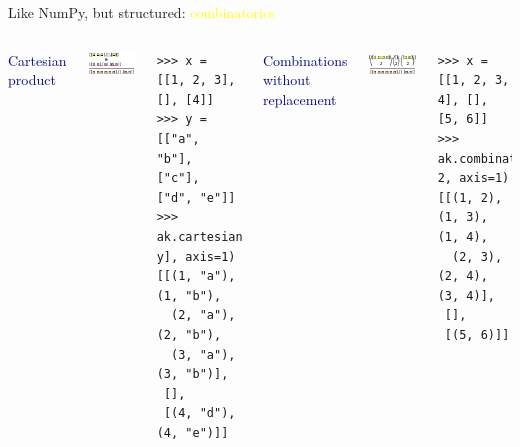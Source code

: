 \documentclass[aspectratio=169]{beamer}
\begin{document}
\begin{frame}[fragile]{Like NumPy, but structured: \textcolor{yellow}{combinatorics}}
\scriptsize
\vspace{0.5 cm}

\begin{columns}
\textcolor{darkblue}{\Large Cartesian product}

\includegraphics[width=\linewidth]{img/cartoon-cartesian.pdf}

\begin{verbatim}
>>> x = [[1, 2, 3], [], [4]]
>>> y = [["a", "b"], ["c"], ["d", "e"]]
>>> ak.cartesian([x, y], axis=1)
[[(1, "a"), (1, "b"),
  (2, "a"), (2, "b"),
  (3, "a"), (3, "b")],
 [],
 [(4, "d"), (4, "e")]]
\end{verbatim}

\textcolor{darkblue}{\Large Combinations without replacement}

\includegraphics[width=\linewidth]{img/cartoon-combinations.pdf}

\begin{verbatim}
>>> x = [[1, 2, 3, 4], [], [5, 6]]
>>> ak.combinations(x, 2, axis=1)
[[(1, 2), (1, 3), (1, 4),
  (2, 3), (2, 4), (3, 4)],
 [],
 [(5, 6)]]
\end{verbatim}
\vspace{\baselineskip}
\end{columns}
\end{frame}
\end{document}
